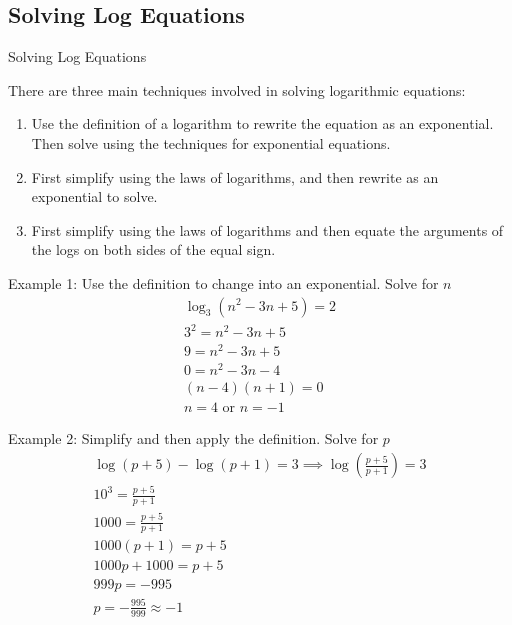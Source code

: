 \documentclass{article}
\begin{document}
\subsection{Solving Log Equations}
\begin{lessonbox}{Solving Log Equations}
    
There are three main techniques involved in solving logarithmic equations:
\begin{enumerate}
    \item Use the definition of a logarithm to rewrite the equation as an exponential. Then solve using the techniques for exponential equations.
    \item First simplify using the laws of logarithms, and then rewrite as an exponential to solve.
    \item First simplify using the laws of logarithms and then equate the arguments of the logs on both sides of the equal sign.
\end{enumerate}
\end{lessonbox}

\begin{examplebox}{Example 1: Use the definition to change into an exponential. Solve for \( n \)}
\begin{align*}
\log_3{(n^2 - 3n + 5)} = 2 \\
3^2 = n^2 - 3n + 5 \\
9 = n^2 - 3n + 5 \\
0 = n^2 - 3n - 4 \\
(n-4)(n+1) = 0 \\
n = 4 \text{ or } n = -1
\end{align*}

\end{examplebox}

\begin{examplebox}{Example 2: Simplify and then apply the definition. Solve for \( p \)}
\begin{align*}
\log{(p+5)} - \log{(p+1)} = 3 \implies \log{\left(\frac{p+5}{p+1}\right)} = 3 \\
10^3 = \frac{p+5}{p+1} \\
1000 = \frac{p+5}{p+1}\\
1000(p+1) = p + 5 \\
1000p + 1000 = p + 5 \\
999p = -995\\
p = -\frac{995}{999} \approx -1
\end{align*}

\end{examplebox}
\end{document}
